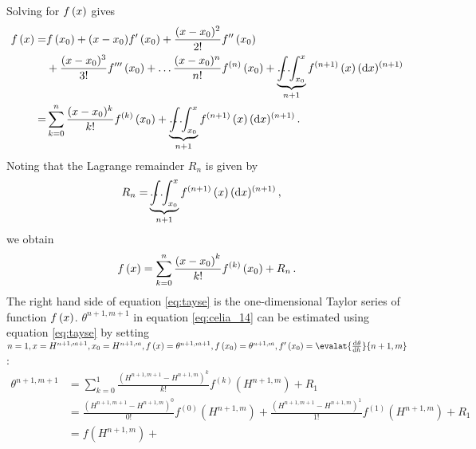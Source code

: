 Solving for $f\del{ x }$ gives
\begin{align*}
  f\del{ x } = &f\del{ x_0 }
           + (x - x_0) f'\del{ x_0 }
           + \frac{(x-x_0)^2}{2!} f''\del{ x_0 } \\
         &+ \frac{(x - x_0)^3}{3!} f'''\del{ x_0 }
           + \mathellipsis \frac{(x - x_0)^n}{n!} f^{(n)}\del{ x_0 }
           + \underbrace{\int \hspace{-4mm} \hdots \hspace{-1mm} \int_{x_0}^x}_{n+1}{f^{(n+1)}\del{ x }(\dif x)^{(n+1)}} \\
  = &\sum_{k=0}^n{\frac{(x - x_0)^k}{k!}}f^{(k)}\del{ x_0 } + \underbrace{\int \hspace{-4mm} \hdots \hspace{-1mm} \int_{x_0}^x}_{n+1}{f^{(n+1)}\del{ x }(\dif x)^{(n+1)}} \, .
\end{align*}
Noting that the Lagrange remainder $R_n$ is given by
\begin{align*}
  R_n = &\underbrace{\int \hspace{-4mm} \hdots \hspace{-1mm} \int_{x_0}^x}_{n+1}{f^{(n+1)}\del{ x }(\dif x)^{(n+1)}} \, ,
\end{align*}
we obtain
\begin{equation}
  \label{eq:tayse}
  f\del{ x } = \sum_{k=0}^n{\frac{\del{ x - x_0 }^k}{k!}}f^{(k)}\del{ x_0 } + R_n \, .
\end{equation}
The right hand side of equation \eqref{eq:tayse} is the one-dimensional Taylor series of function $f\del{ x }$.  $\theta^{n+1,m+1}$ in equation \eqref{eq:celia_14} can be estimated using equation \eqref{eq:tayse} by setting $n = 1, x = H^{n+1,m+1}, x_0 = H^{n+1,m}, f\del{ x } = \theta^{n+1,m+1}, f\del{ x_0 } = \theta^{n+1,m}, f'\del{ x_0 } = \evalat{\od{\theta}{h}}{n+1,m}$ \parencite{celia_general_1990}:
\begin{align}
  \label{eq:celia_15}
  \theta^{n+1,m+1} &= \sum_{k=0}^1\frac{(H^{n+1,m+1} - H^{n+1,m})^k}{k!}f^{(k)}(H^{n+1,m}) + R_1 \\
                   &= \frac{(H^{n+1,m+1} - H^{n+1,m})^0}{0!} f^{(0)}(H^{n+1,m}) + \frac{(H^{n+1,m+1} - H^{n+1,m})^1}{1!} f^{(1)}(H^{n+1,m}) + R_1 \\
                   &= f(H^{n+1,m}) + 
\end{align}

